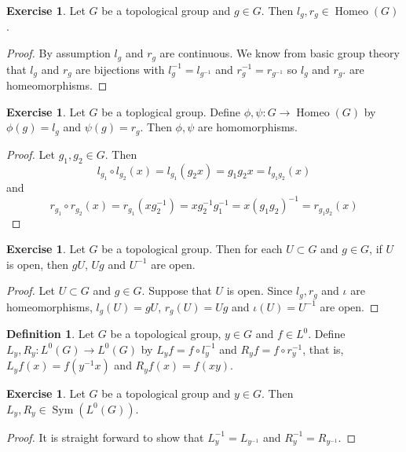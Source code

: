 \documentclass[12pt]{amsart}
\theoremstyle{definition}
\newtheorem{defn}[definition]{Definition}
\newtheorem{ex}[definition]{Exercise}
\DeclareMathOperator{\Homeo}{Homeo}
\DeclareMathOperator{\Sym}{Sym}
\newcommand{\lex}[1]{\label{ex:#1}}
\newcommand{\ld}[1]{\label{defn:#1}}
\begin{document}
	\begin{ex} \lex{00000} 
		Let $G$ be a topological group and $g \in G$. Then $l_g, r_g \in \Homeo(G)$.
	\end{ex}
	
	\begin{proof}
		By assumption $l_g$ and $r_g$ are continuous. We know from basic group theory that $l_g$ and $r_g$ are bijections with $l_g^{-1} = l_{g^{-1}}$ and $r_g^{-1} = r_{g^{-1}}$ so $l_g$ and $r_g$. are homeomorphisms. 
	\end{proof}
	
	\begin{ex} \lex{00000} 
	Let $G$ be a toplogical group. Define $\phi, \psi:G \rightarrow \Homeo(G)$ by $\phi(g) = l_g$ and $\psi(g) = r_g$. Then $\phi, \psi$ are homomorphisms.
	\end{ex}
	
	\begin{proof}
	Let $g_1, g_2 \in G$. Then $$l_{g_1} \circ l_{g_2}(x) = l_{g_1}(g_2 x) = g_1 g_2 x= l_{g_1 g_2}(x)$$ and $$r_{g_1} \circ r_{g_2} (x) = r_{g_1}(x g_2^{-1})= xg_2^{-1}g_1^{-1} = x(g_1g_2)^{-1} = r_{g_1g_2}(x)$$ 
	\end{proof}
	
	\begin{ex} \lex{00000} 
		Let $G$ be a topological group. Then for each $U \subset G$ and $g \in G$, if $U$ is open, then $gU$, $Ug$ and $U^{-1}$ are open. 
	\end{ex}
	\begin{proof}
		Let $U \subset G$ and $g \in G$. Suppose that $U$ is open. Since $l_g, r_g$ and $\iota$ are homeomorphisms, $l_g(U) = gU$, $r_g(U) = Ug$ and $\iota(U) = U^{-1}$ are open. 
	\end{proof}
	
	\begin{defn} \ld{00000} 
		Let $G$ be a topological group, $y \in G$ and $f \in L^0$.  Define $L_y, R_y: L^0(G) \rightarrow L^0(G)$ by $L_y f = f \circ l_y^{-1}$ and $R_y f = f \circ r_y^{-1}$, that is, $L_yf(x) = f(y^{-1}x)$ and $R_yf(x) = f(xy)$.
	\end{defn}
	
	\begin{ex} \lex{00000} 
	Let $G$ be a topological group and $y \in G$. Then $L_y, R_y \in \Sym(L^0(G))$. 
	\end{ex}
	
	\begin{proof}
	It is straight forward to show that $L_y^{-1} = L_{y^{-1}}$ and $R_y^{-1} = R_{y^{-1}}$. 
	\end{proof}
	
\end{document}

